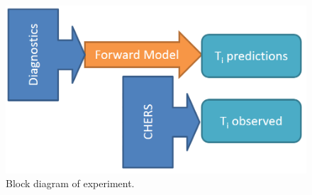 \begin{refsection}
\begin{figure}
    \centering
    \includegraphics[width=0.75\linewidth]{./1_Introduction/exp_structure_diagram.png}
    \caption[Block diagram of experiment]{Block diagram of experiment.}
    \label{fig:ppcd_fluc}
\end{figure}

\printbibliography


\end{refsection}
